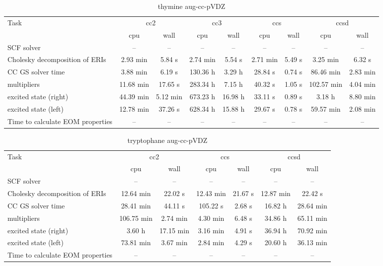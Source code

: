 \documentclass{article}
\begin{document}
\begin{table}
\caption{thymine aug-cc-pVDZ}
\begin{tabular}{lcccccccc}
\toprule
Task & \multicolumn{2}{c}{cc2} & \multicolumn{2}{c}{cc3} & \multicolumn{2}{c}{ccs} & \multicolumn{2}{c}{ccsd}\\
\cmidrule(lr){2-3}\cmidrule(lr){4-5}\cmidrule(lr){6-7}\cmidrule(lr){8-9}
 & cpu & wall & cpu & wall & cpu & wall & cpu & wall\\
\midrule
SCF solver & -- & -- & -- & -- & -- & -- & -- & --\\
Cholesky decomposition of ERIs & 2.93 min & 5.84 s & 2.74 min & 5.54 s & 2.71 min & 5.49 s & 3.25 min & 6.32 s\\
CC GS solver time & 3.88 min & 6.19 s & 130.36 h & 3.29 h & 28.84 s & 0.74 s & 86.46 min & 2.83 min\\
multipliers & 11.68 min & 17.65 s & 283.34 h & 7.15 h & 40.32 s & 1.05 s & 102.57 min & 4.04 min\\
excited state (right) & 44.39 min & 5.12 min & 673.23 h & 16.98 h & 33.11 s & 0.89 s & 3.18 h & 8.80 min\\
excited state (left) & 12.78 min & 37.26 s & 628.34 h & 15.88 h & 29.67 s & 0.78 s & 59.57 min & 2.08 min\\
Time to calculate EOM properties & -- & -- & -- & -- & -- & -- & -- & --\\
\bottomrule
\end{tabular}
\end{table}
\begin{table}
\caption{tryptophane aug-cc-pVDZ}
\begin{tabular}{lcccccc}
\toprule
Task & \multicolumn{2}{c}{cc2} & \multicolumn{2}{c}{ccs} & \multicolumn{2}{c}{ccsd}\\
\cmidrule(lr){2-3}\cmidrule(lr){4-5}\cmidrule(lr){6-7}
 & cpu & wall & cpu & wall & cpu & wall\\
\midrule
SCF solver & -- & -- & -- & -- & -- & --\\
Cholesky decomposition of ERIs & 12.64 min & 22.02 s & 12.43 min & 21.67 s & 12.87 min & 22.42 s\\
CC GS solver time & 28.41 min & 44.11 s & 105.22 s & 2.68 s & 16.82 h & 28.64 min\\
multipliers & 106.75 min & 2.74 min & 4.30 min & 6.48 s & 34.86 h & 65.11 min\\
excited state (right) & 3.60 h & 17.15 min & 3.16 min & 4.91 s & 36.94 h & 70.92 min\\
excited state (left) & 73.81 min & 3.67 min & 2.84 min & 4.29 s & 20.60 h & 36.13 min\\
Time to calculate EOM properties & -- & -- & -- & -- & -- & --\\
\bottomrule
\end{tabular}
\end{table}
\end{document}

